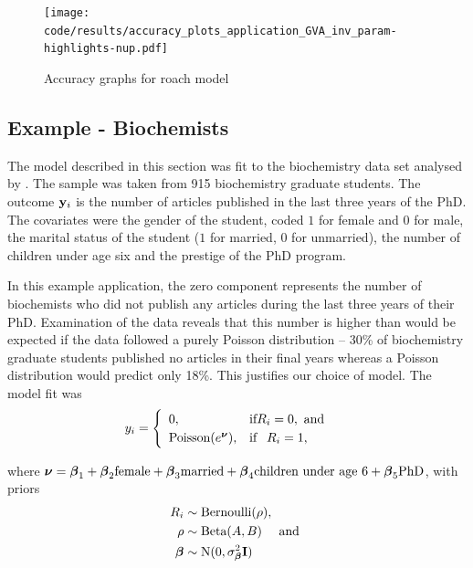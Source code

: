 \begin{figure}[h]
	\centering
	\texttt{[image: code/results/accuracy\_plots\_application\_GVA\_inv\_param-highlights-nup.pdf]}
	\caption{Accuracy graphs for roach model}
	\label{fig:accuracy_roach}
\end{figure}
		
\subsection{Example - Biochemists}
\label{sec:biochemists}

The model described in this section was fit to the biochemistry data set
analysed by \cite{Long1990}. The sample was taken from 915 biochemistry
graduate students. The outcome ${\bf y}_i$ is the number of articles published in
the last three years of the PhD. The covariates were the gender of the student,
coded $1$ for female and $0$ for male, the marital status of the student ($1$
for married, $0$ for unmarried), the number of children under age six and the
prestige of the PhD program.

In this example application, the zero component represents the number of
biochemists who did not publish any articles during the last three years of
their PhD. Examination of the data reveals that this number is higher than
would be expected if the data followed a purely Poisson distribution -- 30\% of
biochemistry graduate students published no articles in their final years
whereas a Poisson distribution would predict only 18\%. This justifies our
choice of model. The model fit was
$$
	y_i = \begin{cases}
	\begin{array}{ll}
	0, & \text{if} R_i = 0, \text{ and }\\
	\text{Poisson}(e^{\boldsymbol \nu}), & \text{if} \phantom{-} R_i = 1,
	\end{array}
	\end{cases}
$$

\noindent where ${\boldsymbol \nu} = {\boldsymbol \beta}_1 + {\boldsymbol \beta}_2 \text{female} + {\boldsymbol \beta}_3
\text{married} + {\boldsymbol \beta}_4 \text{children under age 6} + {\boldsymbol \beta}_5 \text{PhD}$,
with priors
\begin{align*}
R_i &\sim \text{Bernoulli}(\rho), \\
\rho &\sim \text{Beta}(A, B) \quad \text{ and } \\
{\boldsymbol \beta} &\sim \text{N}(0, \sigma_{\boldsymbol \beta}^2 {\bf I})
\end{align*}

